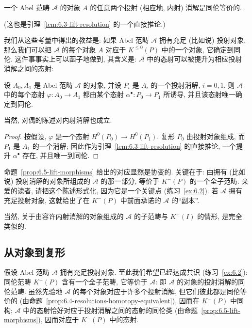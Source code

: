 \begin{proposition}\label{prop:6.4-resolutions-homotopy-equivalent}
一个 Abel 范畴 $\mathcal{A}$ 的对象 $A$ 的任意两个投射 (相应地, 内射) 消解是同伦等价的.
\end{proposition}

\noindent (这也是引理~\ref{lem:6.3-lift-resolution} 的一个直接推论.)

我们从这些考量中得出的教益是: 如果 Abel 范畴 $\mathcal{A}$ 拥有充足 (比如说) 投射对象, 那么我们可以把 $\mathcal{A}$ 的每个对象 $A$ 对应于 $K^{\leq 0}(P)$ 中的一个对象, 它确定到同伦. 这件事事实上可以函子地做到, 其含义是: $\mathcal{A}$ 中的态射可以被提升为相应投射消解之间的态射:

\begin{proposition}\label{prop:6.5-lift-morphisms}
设 $A_0,A_1$ 是 Abel 范畴 $\mathcal{A}$ 的对象, 并设 $P_i$ 是 $A_i$ 的一个投射消解, $i=0,1$. 则 $\mathcal{A}$ 中的每个态射 $\varphi:A_0\to A_1$ 都由某个态射 $\alpha^\bullet:P_0\to P_1$ 所诱导, 并且该态射唯一确定到同伦.
\end{proposition}

\noindent 当然, 对偶的陈述对内射消解也成立.

\begin{proof}
按假设, $\varphi$ 是一个态射 $H^0(P_0)\to H^0(P_1)$. 复形 $P_0$ 由投射对象组成, 而 $P_1$ 是 $A_1$ 的一个消解; 因此作为引理~\ref{lem:6.3-lift-resolution} 的直接推论, 一个提升 $\alpha^\bullet$ 存在, 并且唯一到同伦.
\end{proof}

\noindent 命题~\ref{prop:6.5-lift-morphisms} 给出的对应显然是协变的. 关键在于: 由拥有 (比如说) 投射消解的对象所组成的 $\mathcal{A}$ 的那一部分, 等价于 $K^{-}(P)$ 的一个全子范畴. 亲爱的读者, 请把这个陈述形式化, 因为它是一个关键点 (练习~\ref{ex:6.2}). 若 $\mathcal{A}$ 拥有充足投射对象, 这就给出了在 $K^{-}(P)$ 中前面承诺的 $\mathcal{A}$ 的``副本''.

当然, 关于由容许内射消解的对象组成的 $\mathcal{A}$ 的子范畴与 $K^{+}(I)$ 的情形, 是完全类似的.

\subsection{从对象到复形}
\label{subsec:6.2-objects-complexes}

假设 Abel 范畴 $\mathcal{A}$ 拥有充足投射对象. 至此我们希望已经达成共识 (练习~\ref{ex:6.2}): 同伦范畴 $K^{-}(P)$ 含有一个全子范畴, 它等价于 $\mathcal{A}$: 即 $\mathcal{A}$ 的对象的投射消解的同伦范畴. 虽然先验地 $\mathcal{A}$ 的每个对象对应于许多个投射消解, 但它们彼此都是同伦等价的 (由命题~\ref{prop:6.4-resolutions-homotopy-equivalent}), 因而在 $K^{-}(P)$ 中同构; $\mathcal{A}$ 中的态射恰好对应于投射消解之间的态射的同伦类 (由命题~\ref{prop:6.5-lift-morphisms}), 因而对应于 $K^{-}(P)$ 中的态射.

